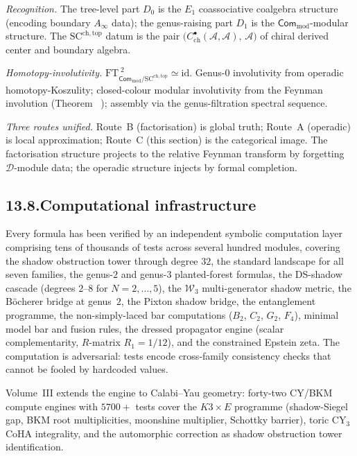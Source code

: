 \documentclass[11pt,reqno]{amsart}
\makeatletter
\theoremstyle{definition}
\theoremstyle{remark}
\providecommand{\cA}{\mathcal{A}}
\providecommand{\cD}{\mathcal{D}}
\providecommand{\cW}{\mathcal{W}}
\providecommand{\SCchtop}{\mathrm{SC}^{\mathrm{ch,top}}}
\providecommand{\id}{\mathrm{id}}
\providecommand{\mod}{\mathrm{mod}}
\numberwithin{equation}{section}
\let\svy@oldref\ref
\renewcommand{\ref}[1]{%
 \@ifundefined{r@#1}{\textit{full monograph}}{\svy@oldref{#1}}%
}
\makeatother
\begin{document}
\emph{Recognition.} The tree-level part $D_0$ is the
$E_1$ coassociative coalgebra structure (encoding boundary
$A_\infty$ data); the genus-raising part $D_1$
is the $\mathsf{Com}_{\mod}$-modular structure.
The $\SCchtop$ datum is the pair
$\bigl(C^\bullet_{\mathrm{ch}}(\cA,\cA),\,\cA\bigr)$
of chiral derived center and boundary algebra.

\emph{Homotopy-involutivity.}
$\mathrm{FT}_{\mathsf{Com}_{\mod}/\SCchtop}^{\;2} \simeq \id$.
Genus-$0$ involutivity from operadic homotopy-Koszulity;
closed-colour modular involutivity from the Feynman involution
(Theorem~\ref{thm:feynman-involution}); assembly via the
genus-filtration spectral sequence.

\emph{Three routes unified.} Route~B (factorisation) is global
truth; Route~A (operadic) is local approximation; Route~C
(this section) is the categorical image. The factorisation
structure projects to the relative Feynman transform by
forgetting $\cD$-module data; the operadic structure injects
by formal completion.

\subsection*{13.8.\enspace Computational infrastructure}

Every formula has been verified by an independent symbolic
computation layer comprising tens of thousands of tests across
several hundred modules, covering the shadow obstruction tower
through degree $32$, the standard landscape for all seven
families, the genus-$2$ and genus-$3$ planted-forest formulas,
the DS-shadow cascade (degrees $2$--$8$ for $N = 2, \ldots, 5$),
the $\cW_3$ multi-generator shadow metric, the B\"ocherer bridge
at genus~$2$, the Pixton shadow bridge, the entanglement
programme, the non-simply-laced bar computations ($B_2$, $C_2$,
$G_2$, $F_4$), minimal model bar and fusion rules, the dressed
propagator engine (scalar complementarity, $R$-matrix
$R_1 = 1/12$), and the constrained Epstein zeta. The
computation is adversarial: tests encode cross-family
consistency checks that cannot be fooled by hardcoded values.

Volume~III extends the engine to Calabi--Yau geometry: forty-two
CY/BKM compute engines with $5700+$ tests cover the
$K3 \times E$ programme (shadow-Siegel gap, BKM root
multiplicities, moonshine multiplier, Schottky barrier), toric
CY$_3$ CoHA integrality, and the automorphic correction as
shadow obstruction tower identification.
\end{document}
